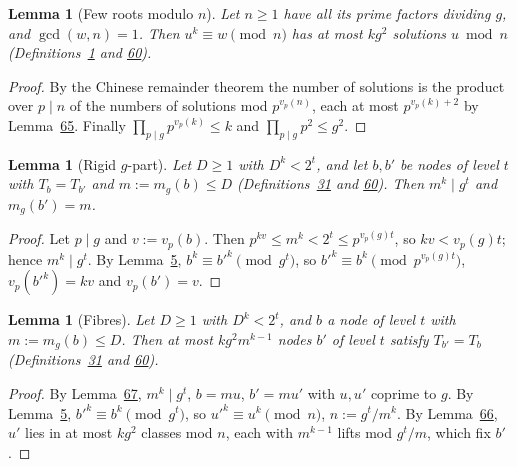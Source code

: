 \documentclass[11pt]{article}
\newcounter{hffc}
\theoremstyle{definition}\newtheorem{hffdef}[hffc]{Definition}
\theoremstyle{plain}\newtheorem{hfflem}[hffc]{Lemma}\newtheorem{hffthm}[hffc]{Theorem}
\theoremstyle{remark}\newtheorem{hffrem}[hffc]{Remark}
\newcommand{\hffcost}{}
\newcommand{\setcost}[1]{\renewcommand{\hffcost}{#1}}
\begin{document}
\begin{hfflem}[Few roots modulo $n$]\label{L:rootsn}
Let $n\ge1$ have all its prime factors dividing $g$, and $\gcd(w,n)=1$. Then $u^k\equiv w\pmod n$ has at most $kg^2$ solutions $u\bmod n$ (Definitions~\hyperref[D:conv]{1} and \hyperref[D:gpart]{60}).
\par\nopagebreak{}
\end{hfflem}
\begin{proof}\setcost{length 158/300}By the Chinese remainder theorem the number of solutions is the product over $p\mid n$ of the numbers of solutions mod $p^{v_p(n)}$, each at most $p^{v_p(k)+2}$ by Lemma~\hyperref[L:rootsp]{65}. Finally $\prod_{p\mid g}p^{v_p(k)}\le k$ and $\prod_{p\mid g}p^2\le g^2$.
\end{proof}

\begin{hfflem}[Rigid $g$-part]\label{L:rigid}
Let $D\ge1$ with $D^k<2^t$, and let $b,b'$ be nodes of level $t$ with $T_b=T_{b'}$ and $m:=m_g(b)\le D$ (Definitions~\hyperref[D:node]{31} and \hyperref[D:gpart]{60}). Then $m^k\mid g^t$ and $m_g(b')=m$.
\par\nopagebreak{}
\end{hfflem}
\begin{proof}\setcost{length 129/300}Let $p\mid g$ and $v:=v_p(b)$. Then $p^{kv}\le m^k<2^t\le p^{v_p(g)t}$, so $kv<v_p(g)t$; hence $m^k\mid g^t$. By Lemma~\hyperref[L:inv]{5}, $b^k\equiv b'^k\pmod{g^t}$, so $b'^k\equiv b^k\pmod{p^{v_p(g)t}}$, $v_p(b'^k)=kv$ and $v_p(b')=v$.
\end{proof}

\begin{hfflem}[Fibres]\label{L:fibre}
Let $D\ge1$ with $D^k<2^t$, and $b$ a node of level $t$ with $m:=m_g(b)\le D$. Then at most $kg^2m^{k-1}$ nodes $b'$ of level $t$ satisfy $T_{b'}=T_b$ (Definitions~\hyperref[D:node]{31} and \hyperref[D:gpart]{60}).
\par\nopagebreak{}
\end{hfflem}
\begin{proof}\setcost{length 168/300}By Lemma~\hyperref[L:rigid]{67}, $m^k\mid g^t$, $b=mu$, $b'=mu'$ with $u,u'$ coprime to $g$. By Lemma~\hyperref[L:inv]{5}, $b'^k\equiv b^k\pmod{g^t}$, so $u'^k\equiv u^k\pmod n$, $n:=g^t/m^k$. By Lemma~\hyperref[L:rootsn]{66}, $u'$ lies in at most $kg^2$ classes mod $n$, each with $m^{k-1}$ lifts mod $g^t/m$, which fix $b'$.
\end{proof}
\end{document}
